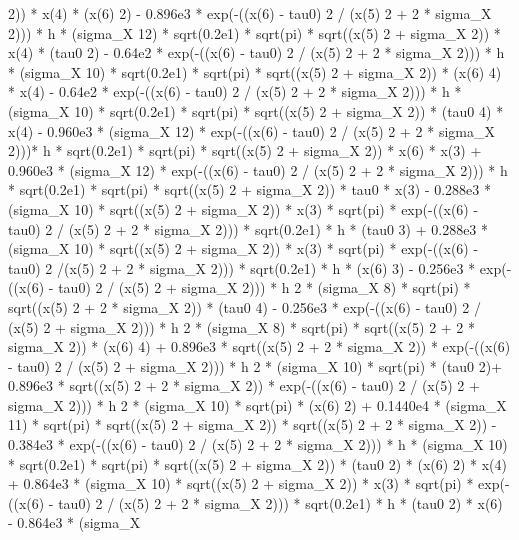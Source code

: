 \begin{maplegroup}
2)) * x(4) * (x(6)  2) - 0.896e3 * exp(-((x(6) - tau0)  2 / (x(5)  2 + 2 * sigma\_X  2))) * h * (sigma\_X  12) * sqrt(0.2e1) * sqrt(pi) * sqrt((x(5)  2 + sigma\_X  2)) * x(4) * (tau0  2) - 0.64e2 * exp(-((x(6) - tau0)  2 / (x(5)  2 + 2 * sigma\_X  2))) * h * (sigma\_X  10) * sqrt(0.2e1) * sqrt(pi) * sqrt((x(5)  2 + sigma\_X  2)) * (x(6)  4) * x(4) - 0.64e2 * exp(-((x(6) - tau0)  2 / (x(5)  2 + 2 * sigma\_X  2))) * h * (sigma\_X  10) * sqrt(0.2e1) * sqrt(pi) * sqrt((x(5)  2 + sigma\_X  2)) * (tau0  4) * x(4) - 0.960e3 * (sigma\_X  12) * exp(-((x(6) - tau0)  2 / (x(5)  2 + 2 * sigma\_X  2)))* h * sqrt(0.2e1) * sqrt(pi) * sqrt((x(5)  2 + sigma\_X  2)) * x(6) * x(3) + 0.960e3 * (sigma\_X  12) * exp(-((x(6) - tau0)  2 / (x(5)  2 + 2 * sigma\_X  2))) * h * sqrt(0.2e1) * sqrt(pi) * sqrt((x(5)  2 + sigma\_X  2)) * tau0 * x(3) - 0.288e3 * (sigma\_X  10) * sqrt((x(5)  2 + sigma\_X  2)) * x(3) * sqrt(pi) * exp(-((x(6) - tau0)  2 / (x(5)  2 + 2 * sigma\_X  2))) * sqrt(0.2e1) * h * (tau0  3) + 0.288e3 * (sigma\_X  10) * sqrt((x(5)  2 + sigma\_X  2)) * x(3) * sqrt(pi) * exp(-((x(6) - tau0)  2 /(x(5)  2 + 2 * sigma\_X  2))) * sqrt(0.2e1) * h * (x(6)  3) - 0.256e3 * exp(-((x(6) - tau0)  2 / (x(5)  2 + sigma\_X  2))) * h  2 * (sigma\_X  8) * sqrt(pi) * sqrt((x(5)  2 + 2 * sigma\_X  2)) * (tau0  4) - 0.256e3 * exp(-((x(6) - tau0)  2 / (x(5) 2 + sigma\_X  2))) * h  2 * (sigma\_X  8) * sqrt(pi) * sqrt((x(5)  2 + 2 * sigma\_X  2)) * (x(6)  4) + 0.896e3 * sqrt((x(5)  2 + 2 * sigma\_X  2)) * exp(-((x(6) - tau0)  2 / (x(5)  2 + sigma\_X  2))) * h  2 * (sigma\_X  10) * sqrt(pi) * (tau0  2)+ 0.896e3 * sqrt((x(5)  2 + 2 * sigma\_X  2)) * exp(-((x(6) - tau0)  2 / (x(5)  2 + sigma\_X  2))) * h  2 * (sigma\_X  10) * sqrt(pi) * (x(6)  2) + 0.1440e4 * (sigma\_X  11) * sqrt(pi) * sqrt((x(5)  2 + sigma\_X  2)) * sqrt((x(5)  2 + 2 * sigma\_X 2)) - 0.384e3 * exp(-((x(6) - tau0)  2 / (x(5)  2 + 2 * sigma\_X  2))) * h * (sigma\_X  10) * sqrt(0.2e1) * sqrt(pi) * sqrt((x(5)  2 + sigma\_X  2)) * (tau0  2) * (x(6)  2) * x(4) + 0.864e3 * (sigma\_X  10) * sqrt((x(5)  2 + sigma\_X  2)) * x(3) * sqrt(pi) * exp(-((x(6) - tau0)  2 / (x(5)  2 + 2 * sigma\_X  2))) * sqrt(0.2e1) * h * (tau0  2) * x(6) - 0.864e3 * (sigma\_X 
\end{maplegroup}
